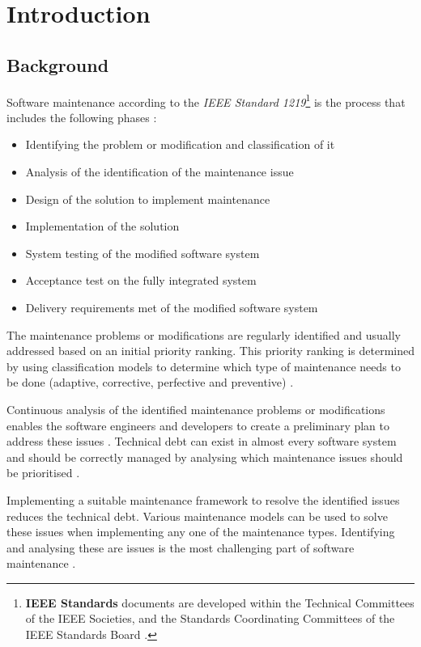 \chapter{Introduction}
\label{chap:1}

\section{Background}\label{section:background}

Software maintenance according to the \textit{IEEE Standard 1219}\footnote{\textbf{IEEE Standards} documents are developed within the Technical Committees of the IEEE Societies, and the Standards Coordinating Committees of the IEEE Standards Board \cite{Mamone1994}.} is the process that includes the following phases \cite{Mamone1994, Hasan2012}:
\begin{itemize}
	\item Identifying the problem or modification and classification of it
	\item Analysis of the identification of the maintenance issue
	\item Design of the solution to implement maintenance
	\item Implementation of the solution
	\item System testing of the modified software system
	\item Acceptance test on the fully integrated system
	\item Delivery requirements met of the modified software system
\end{itemize}

The maintenance problems or modifications are regularly identified and usually addressed based on an initial priority ranking. This priority ranking is determined by using classification models to determine which type of maintenance needs to be done (adaptive, corrective, perfective and preventive) \cite{Tang2010,Mamone1994,Ping2010}.\par Continuous analysis of the identified maintenance problems or modifications enables the software engineers and developers to create a preliminary plan to address these issues \cite{Port2017}. Technical debt can exist in almost every software system and should be correctly managed by analysing which maintenance issues should be prioritised \cite{DeLeon-Sigg2020,Reimanis2016}.\par Implementing a suitable maintenance framework to resolve the identified issues reduces the technical debt. Various maintenance models can be used to solve these issues when implementing any one of the maintenance types. Identifying and analysing these are issues is the most challenging part of software maintenance \cite{DeLeon-Sigg2020}.

